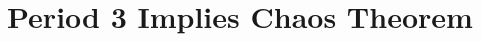 \documentclass[notes]{beamer}
\begin{document}
%
%
%
%
%
%
\section[Period 3 Proof ]{Period 3 Implies Chaos Theorem}
\end{document}

